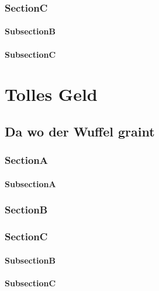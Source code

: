 \documentclass[ElegantBook]{Lilly}
\begin{document}
\section{SectionC}
  \lipsum[1-2]
\subsection{SubsectionB}
  \lipsum[1]
\subsection{SubsectionC}
  \lipsum[2]


\part{Tolles Geld}


\chapter{Da wo der Wuffel graint}
    \printMiniToc

\section{SectionA}
\subsection{SubsectionA}
\section{SectionB}
\section{SectionC}
\subsection{SubsectionB}
\subsection{SubsectionC}
\end{document}
